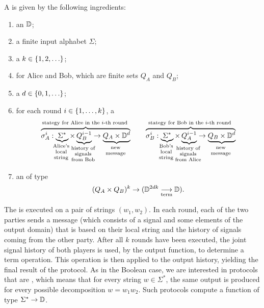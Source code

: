 \begin{definition}\label{def:two-party-protocol-general} \AP A 
   is given by the following ingredients: 
  \begin{enumerate}
    \item an  $\mathbb D$;
    \item a finite input alphabet $\Sigma$;
    \item a  $k \in \{1,2,\ldots\}$;
    \item {} for Alice and Bob, which are finite sets $Q_A$ and $Q_B$;
    \item a  $d \in \{0,1,\ldots\}$;
    \item for each round $i \in \{1,\ldots,k\}$, a 
    \begin{align*}
    \myoverbrace{\sigma_A^i : \myunderbrace{\Sigma^*}{Alice's \\ local\\ string} \times \myunderbrace{Q_B^{i-1}}{history of \\ signals \\ from Bob}  \to \myunderbrace{Q_A \times \domain^d}{new\\ message}}{stategy for Alice in the $i$-th round}
    \qquad 
        \myoverbrace{\sigma_B^i : \myunderbrace{\Sigma^*}{Bob's \\ local\\ string} \times \myunderbrace{Q_A^{i-1}}{history of \\ signals \\ from Alice}  \to \myunderbrace{Q_B \times \domain^d}{new\\ message}}{stategy for Bob in the $i$-th round}
    \end{align*}
    \item an  of type \begin{align*}
    (Q_A \times Q_B)^{k} \to (\mathbb D^{2dk} \underset{\text{term}}{\longrightarrow} \mathbb D).
    \end{align*}
  \end{enumerate}
\end{definition}


\AP
The  is executed on a pair of strings $(w_1,w_2)$. In each round, each
of the two parties  sends a message (which consists of a signal and some
elements of the output domain) that is based on their local string and the
history of signals coming from the other party. After all $k$ rounds have been
executed, the joint signal history of both players is used, by the output
function, to determine a term operation. This operation is then applied to the
output history, yielding the final result of the protocol. As in the Boolean
case, we are interested in protocols that are , which means that
for every string $w \in \Sigma^*$, the same output is produced for every
possible decomposition $w = w_1 w_2$. Such protocols compute a function of type
$\Sigma^* \to \mathbb D$. 

